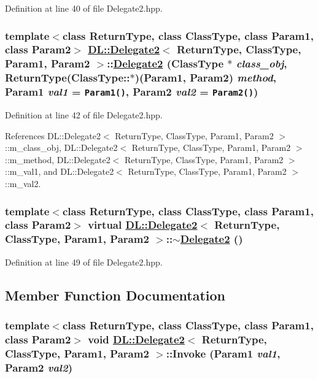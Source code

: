 Definition at line 40 of file Delegate2.hpp.\hypertarget{classDL_1_1Delegate2_a0}{
\subsubsection[Delegate2]{\setlength{\rightskip}{0pt plus 5cm}template$<$class Return\-Type, class Class\-Type, class Param1, class Param2$>$ \hyperlink{classDL_1_1Delegate2}{DL::Delegate2}$<$ Return\-Type, Class\-Type, Param1, Param2 $>$::\hyperlink{classDL_1_1Delegate2}{Delegate2} (Class\-Type $\ast$ {\em class\_\-obj}, Return\-Type(Class\-Type::$\ast$)(Param1, Param2) {\em method}, Param1 {\em val1} = {\tt Param1()}, Param2 {\em val2} = {\tt Param2()})}}
\label{classDL_1_1Delegate2_a0}




Definition at line 42 of file Delegate2.hpp.

References DL::Delegate2$<$ Return\-Type, Class\-Type, Param1, Param2 $>$::m\_\-class\_\-obj, DL::Delegate2$<$ Return\-Type, Class\-Type, Param1, Param2 $>$::m\_\-method, DL::Delegate2$<$ Return\-Type, Class\-Type, Param1, Param2 $>$::m\_\-val1, and DL::Delegate2$<$ Return\-Type, Class\-Type, Param1, Param2 $>$::m\_\-val2.\hypertarget{classDL_1_1Delegate2_a1}{
\subsubsection[$\sim$Delegate2]{\setlength{\rightskip}{0pt plus 5cm}template$<$class Return\-Type, class Class\-Type, class Param1, class Param2$>$ virtual \hyperlink{classDL_1_1Delegate2}{DL::Delegate2}$<$ Return\-Type, Class\-Type, Param1, Param2 $>$::$\sim$\hyperlink{classDL_1_1Delegate2}{Delegate2} ()}}
\label{classDL_1_1Delegate2_a1}




Definition at line 49 of file Delegate2.hpp.

\subsection{Member Function Documentation}
\hypertarget{classDL_1_1Delegate2_a3}{
\subsubsection[Invoke]{\setlength{\rightskip}{0pt plus 5cm}template$<$class Return\-Type, class Class\-Type, class Param1, class Param2$>$ void \hyperlink{classDL_1_1Delegate2}{DL::Delegate2}$<$ Return\-Type, Class\-Type, Param1, Param2 $>$::Invoke (Param1 {\em val1}, Param2 {\em val2})}}
\label{classDL_1_1Delegate2_a3}




